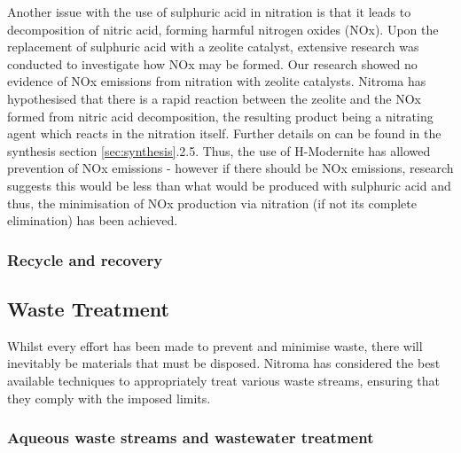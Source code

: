 Another issue with the use of sulphuric acid in nitration is that it leads to decomposition of nitric acid, forming harmful nitrogen oxides (NOx). Upon the replacement of sulphuric acid with a zeolite catalyst, extensive research was conducted to investigate how NOx may be formed. Our research showed no evidence of NOx emissions from nitration with zeolite catalysts. Nitroma has hypothesised that there is a rapid reaction between the zeolite and the NOx formed from nitric acid decomposition, the resulting product being a nitrating agent which reacts in the nitration itself. Further details on can be found in the synthesis section \ref{sec:synthesis}.2.5. Thus, the use of H-Modernite has allowed prevention of NOx emissions - however if there should be NOx emissions, research suggests this would be less than what would be produced with sulphuric acid and thus, the minimisation of NOx production via nitration (if not its complete elimination) has been achieved.  

\subsubsection{Recycle and recovery}


 






\subsection{Waste Treatment}

Whilst every effort has been made to prevent and minimise waste, there will inevitably be materials that must be disposed. Nitroma has considered the best available techniques to appropriately treat various waste streams, ensuring that they comply with the imposed limits.



\subsubsection{Aqueous waste streams and wastewater treatment}

